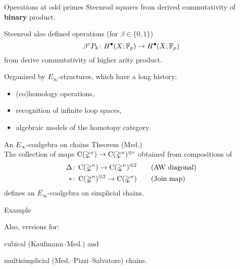
\begin{frame}{Operations at odd primes}
	\pause
	Steenrod squares from derived commutativity of \textbf{binary} product.

	\bigskip\pause
	Steenrod also defined operations (for $\beta \in \{0,1\}$)
	\[
	\beta^{\varepsilon} P_k \colon H^\bullet(X; {\mathbb{F}_p}) \to H^\bullet(X; {\mathbb{F}_p})
	\]
	from derive commutativity of higher arity product.

	\bigskip\pause
	Organized by $E_\infty$-structures\pause, which have a long history:
	\begin{itemize}
		\item (co)homology operations, \pause
		\item recognition of infinite loop spaces, \pause
		\item algebraic models of the homotopy category.
	\end{itemize}
\end{frame}

\begin{frame}{An $E_\infty$-coalgebra on chains}
	\pause
	\textcolor{pblue}{Theorem (Med.)} \\
	The collection of maps $\operatorname{C}(\mathbb{\Delta}^n) \to \operatorname{C}(\mathbb{\Delta}^n)^{\otimes r}$ obtained from compositions of
	\begin{align*}
		\Delta &\colon \operatorname{C}(\mathbb{\Delta}^n) \to \operatorname{C}(\mathbb{\Delta}^n)^{\otimes 2}
		\qquad \text{(AW diagonal)} \\
		\ast &\colon \operatorname{C}(\mathbb{\Delta}^n)^{\otimes 2} \to \operatorname{C}(\mathbb{\Delta}^n)
		\qquad \text{(Join map)}
	\end{align*}
	defines an $E_\infty$-coalgebra on simplicial chains.

	\bigskip\pause
	\textcolor{pblue}{Example} \\
	\qquad\qquad \scalebox{0.7}{}

	\bigskip\pause
	Also, versions for: \par
		\qquad \textcolor{pblue}{cubical} (Kaufmann--Med.) and \par
		\qquad \textcolor{pblue}{multisimplicial} (Med.--Pizzi--Salvatore) chains.
\end{frame}

%
%
%

